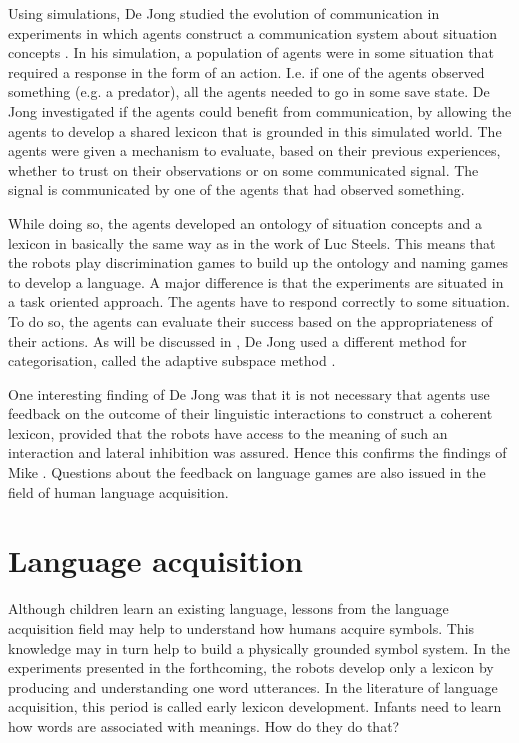 Using simulations, De Jong studied  the evolution of communication in experiments in which agents construct a communication system about situation concepts \citep{dejong:99b}. In his simulation, a population of agents were in some situation that required a response in the form of an action. I.e.  if one of the agents observed something (e.g. a predator), all the agents needed to go in some save state. De Jong investigated if the agents could benefit from communication, by allowing the agents to develop a shared lexicon that is grounded in this simulated world. The agents were given a mechanism to evaluate, based on their previous experiences, whether to trust on their observations or on some communicated signal. The signal is communicated by one of the agents that had observed something.

While doing so, the agents developed an ontology of situation concepts and a lexicon in basically the same way as in the work of Luc Steels. This means that the robots play discrimination games to build up the ontology and naming games to develop a language. A major difference is that the experiments are situated in a task oriented approach. The agents have to respond correctly to some situation. To do so, the agents can evaluate their success based on the appropriateness of their actions. As will be discussed in , De Jong used a different method for categorisation, called the {\sc adaptive subspace method} \citep{dejongvogt:1998}.

One interesting finding of De Jong was that it is not necessary that agents use feedback on the outcome of their linguistic interactions to construct a coherent lexicon, provided that the robots have access to the meaning of such an interaction and lateral inhibition was assured. Hence this confirms the findings of Mike \citet{oliphant:1998}. Questions about the feedback on language games are also issued in the field of human language acquisition.


\section{Language acquisition}\label{s:intro:acquisition}

Although children learn an existing language, lessons from the language acquisition field may help to understand how humans acquire symbols. This knowledge may in turn help to build a physically grounded symbol system. In the experiments presented in the forthcoming, the robots develop only a lexicon by producing and understanding one word utterances. In the literature of language acquisition, this period is called {\sc early lexicon development}. Infants need to learn how words are associated with meanings. How do they do that?

